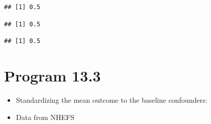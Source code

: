\documentclass[
  10pt,
]{book}
\newenvironment{Shaded}{\begin{snugshade}}{\end{snugshade}}
\newcommand{\DecValTok}[1]{\textcolor[rgb]{0.00,0.00,0.81}{#1}}
\newcommand{\KeywordTok}[1]{\textcolor[rgb]{0.13,0.29,0.53}{\textbf{#1}}}
\newcommand{\NormalTok}[1]{#1}
\newcommand{\OperatorTok}[1]{\textcolor[rgb]{0.81,0.36,0.00}{\textbf{#1}}}
\newcommand{\StringTok}[1]{\textcolor[rgb]{0.31,0.60,0.02}{#1}}
\providecommand{\tightlist}{%
  \setlength{\itemsep}{0pt}\setlength{\parskip}{0pt}}
\begin{document}
\begin{verbatim}
## [1] 0.5
\end{verbatim}

\begin{Shaded}
\end{Shaded}

\begin{verbatim}
## [1] 0.5
\end{verbatim}

\begin{Shaded}
\end{Shaded}

\begin{verbatim}
## [1] 0.5
\end{verbatim}

\hypertarget{program-13.3}{%
\section{Program 13.3}\label{program-13.3}}

\begin{itemize}
\tightlist
\item
  Standardizing the mean outcome to the baseline confounders:
\item
  Data from NHEFS
\end{itemize}
\end{document}
